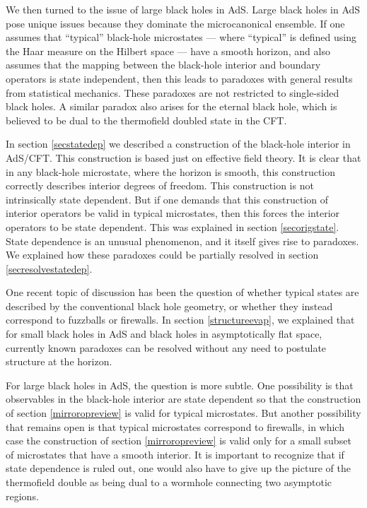 \documentclass[12pt]{article}
\begin{document}
We then turned to the issue of large black holes in AdS. Large black holes in AdS pose unique issues because they dominate the microcanonical ensemble. 
If one assumes that ``typical'' black-hole microstates --- where ``typical'' is defined using the Haar measure on the Hilbert space --- have a smooth horizon, and also assumes that the mapping between the black-hole interior and boundary operators is state independent, then this leads to paradoxes with general results from statistical mechanics. These paradoxes are not restricted to single-sided black holes. A similar paradox also arises for the eternal black hole, which is believed to be dual to the thermofield doubled state in the CFT.

In section \ref{secstatedep} we described a construction of the black-hole interior in AdS/CFT. This construction is based just on effective field theory. It is clear that in any
black-hole microstate, where the horizon is smooth, this construction 
correctly describes interior degrees of freedom. This construction is not intrinsically state dependent.  But if one demands that this construction of interior operators be valid in typical microstates, then this forces the interior operators to be state dependent. This was explained in section \ref{secorigstate}. State dependence is an unusual phenomenon, and it itself gives rise to paradoxes. We explained how these paradoxes could be partially resolved in section \ref{secresolvestatedep}.

One recent topic of discussion has been the question of whether
typical states are described by the conventional black hole geometry, or whether they instead correspond to fuzzballs or firewalls. In section \ref{structureevap}, we explained that for small black holes in AdS and black holes in asymptotically flat space, currently known  paradoxes can be resolved without any need to postulate structure at the horizon. 

For large black holes in AdS, the question is more subtle. One possibility is that  observables in the black-hole interior are state dependent so that the construction of section \ref{mirroropreview} is valid for typical microstates.  But another possibility that remains open is that typical microstates correspond to firewalls, in which case the construction of section \ref{mirroropreview} is valid only for a small subset of microstates that have a smooth interior. It is important to recognize that if state dependence is ruled out, one would also have to give up the picture of the thermofield double as being dual to a wormhole connecting two asymptotic regions. 
\end{document}
